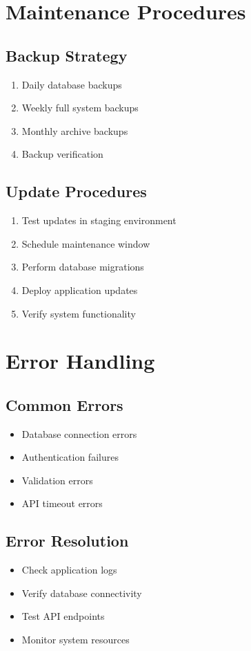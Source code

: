 \section{Maintenance Procedures}
\subsection{Backup Strategy}
\begin{enumerate}
    \item Daily database backups
    \item Weekly full system backups
    \item Monthly archive backups
    \item Backup verification
\end{enumerate}

\subsection{Update Procedures}
\begin{enumerate}
    \item Test updates in staging environment
    \item Schedule maintenance window
    \item Perform database migrations
    \item Deploy application updates
    \item Verify system functionality
\end{enumerate}

\section{Error Handling}
\subsection{Common Errors}
\begin{itemize}
    \item Database connection errors
    \item Authentication failures
    \item Validation errors
    \item API timeout errors
\end{itemize}

\subsection{Error Resolution}
\begin{itemize}
    \item Check application logs
    \item Verify database connectivity
    \item Test API endpoints
    \item Monitor system resources
\end{itemize} 